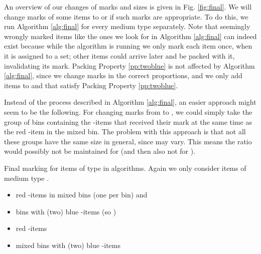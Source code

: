 An overview of our changes of marks and sizes
is given in Fig. \ref{fig:final}. 
We will change marks of some items to  or  if
such marks are appropriate. To do this, we run Algorithm \ref{alg:final}
for every medium type  separately.
Note that seemingly wrongly marked items like the ones we look for in
Algorithm \ref{alg:final} can indeed exist because while the algorithm is
running we only mark
each item once, when it is assigned to a set; other items could arrive later
and be packed with it, invalidating its mark.
Packing Property \ref{pp:twoblue} is not affected by Algorithm \ref{alg:final},
since we change marks in the correct proportions, and we only add items to  and 
that satisfy Packing Property \ref{pp:twoblue}. 

Instead of the process described in Algorithm \ref{alg:final}, an easier approach might seem to be
the following. For changing marks from  to , we could simply take the group of bins containing 
the -items that received their mark at the same time as the red -item in the mixed bin.
The problem with this approach is that not all these groups have the same size in general, since  may vary. This means the ratio  would possibly not
be maintained for  (and then also not for ).


\begin{algorithm}[t]
\caption{\label{alg:final}
Final marking for items of type  in {\EHarm} algorithms. Again we only
consider items of medium type .}
\begin{algorithmic}[1]
\label{final:sort}
\For{}
	\begin{itemize}
		\item  red -items in mixed bins (one per bin) and
		\item  bins with (two) blue -items (so )
	\end{itemize}
\EndFor
{}
	\begin{itemize}
		\item  red -items 
		\item  mixed bins with (two) blue -items
	\end{itemize}
\end{algorithmic}
\end{algorithm}


